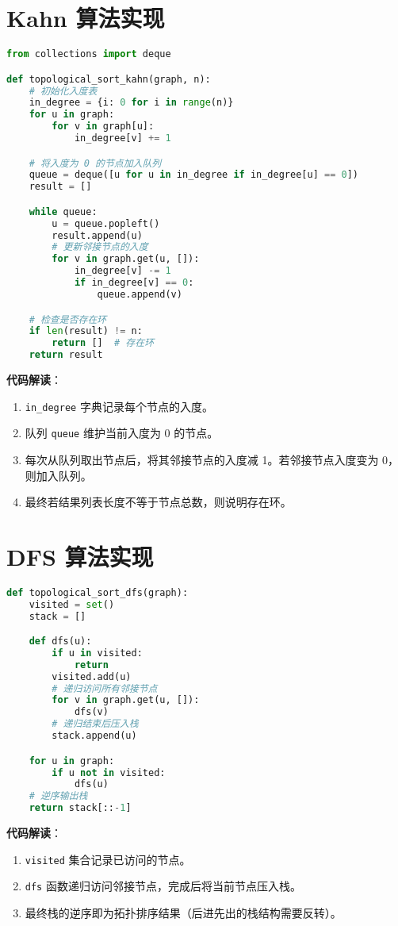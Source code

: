 \section{Kahn 算法实现}
\begin{lstlisting}[language=python]
from collections import deque  

def topological_sort_kahn(graph, n):  
    # 初始化入度表  
    in_degree = {i: 0 for i in range(n)}  
    for u in graph:  
        for v in graph[u]:  
            in_degree[v] += 1  

    # 将入度为 0 的节点加入队列  
    queue = deque([u for u in in_degree if in_degree[u] == 0])  
    result = []  

    while queue:  
        u = queue.popleft()  
        result.append(u)  
        # 更新邻接节点的入度  
        for v in graph.get(u, []):  
            in_degree[v] -= 1  
            if in_degree[v] == 0:  
                queue.append(v)  

    # 检查是否存在环  
    if len(result) != n:  
        return []  # 存在环  
    return result  
\end{lstlisting}
\textbf{代码解读}：\par
\begin{enumerate}
\item \verb!in_degree! 字典记录每个节点的入度。
\item 队列 \verb!queue! 维护当前入度为 0 的节点。
\item 每次从队列取出节点后，将其邻接节点的入度减 1。若邻接节点入度变为 0，则加入队列。
\item 最终若结果列表长度不等于节点总数，则说明存在环。
\end{enumerate}
\section{DFS 算法实现}
\begin{lstlisting}[language=python]
def topological_sort_dfs(graph):  
    visited = set()  
    stack = []  

    def dfs(u):  
        if u in visited:  
            return  
        visited.add(u)  
        # 递归访问所有邻接节点  
        for v in graph.get(u, []):  
            dfs(v)  
        # 递归结束后压入栈  
        stack.append(u)  

    for u in graph:  
        if u not in visited:  
            dfs(u)  
    # 逆序输出栈  
    return stack[::-1]  
\end{lstlisting}
\textbf{代码解读}：\par
\begin{enumerate}
\item \verb!visited! 集合记录已访问的节点。
\item \verb!dfs! 函数递归访问邻接节点，完成后将当前节点压入栈。
\item 最终栈的逆序即为拓扑排序结果（后进先出的栈结构需要反转）。
\end{enumerate}
